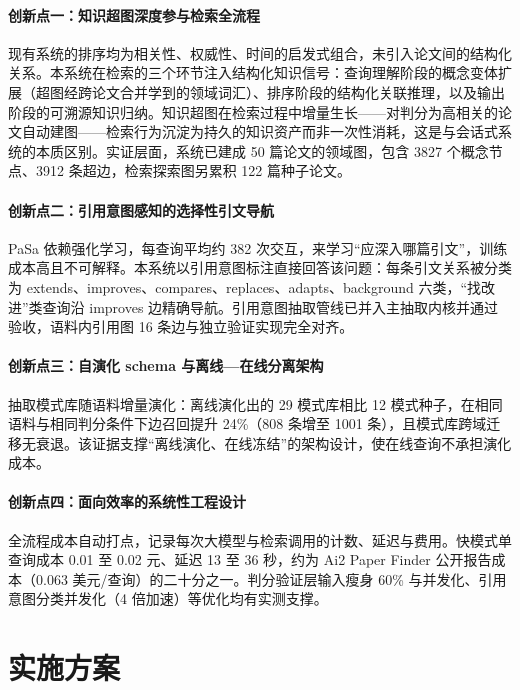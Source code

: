 \documentclass[12pt,a4paper]{ctexart}
\begin{document}
\paragraph{创新点一：知识超图深度参与检索全流程}
现有系统的排序均为相关性、权威性、时间的启发式组合，未引入论文间的结构化关系。本系统在检索的三个环节注入结构化知识信号：查询理解阶段的概念变体扩展（超图经跨论文合并学到的领域词汇）、排序阶段的结构化关联推理，以及输出阶段的可溯源知识归纳。知识超图在检索过程中增量生长——对判分为高相关的论文自动建图——检索行为沉淀为持久的知识资产而非一次性消耗，这是与会话式系统的本质区别。实证层面，系统已建成 50 篇论文的领域图，包含 3827 个概念节点、3912 条超边，检索探索图另累积 122 篇种子论文。

\paragraph{创新点二：引用意图感知的选择性引文导航}
PaSa 依赖强化学习，每查询平均约 382 次交互，来学习“应深入哪篇引文”，训练成本高且不可解释。本系统以引用意图标注直接回答该问题：每条引文关系被分类为 extends、improves、compares、replaces、adapts、background 六类，“找改进”类查询沿 improves 边精确导航。引用意图抽取管线已并入主抽取内核并通过验收，语料内引用图 16 条边与独立验证实现完全对齐。

\paragraph{创新点三：自演化 schema 与离线—在线分离架构}
抽取模式库随语料增量演化：离线演化出的 29 模式库相比 12 模式种子，在相同语料与相同判分条件下边召回提升 24\%（808 条增至 1001 条），且模式库跨域迁移无衰退。该证据支撑“离线演化、在线冻结”的架构设计，使在线查询不承担演化成本。

\paragraph{创新点四：面向效率的系统性工程设计}
全流程成本自动打点，记录每次大模型与检索调用的计数、延迟与费用。快模式单查询成本 0.01 至 0.02 元、延迟 13 至 36 秒，约为 Ai2 Paper Finder 公开报告成本（0.063 美元/查询）的二十分之一。判分验证层输入瘦身 60\% 与并发化、引用意图分类并发化（4 倍加速）等优化均有实测支撑。

\section{实施方案}
\end{document}
